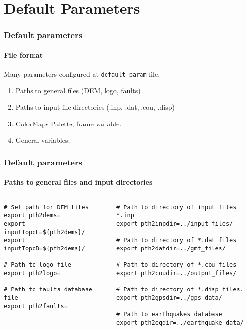 \section[Defaults]{Default Parameters}

\graphicspath{{Chapter3/Figs/Vector/}}

\begin{frame}
  \frametitle{Default parameters}
  \framesubtitle{File format}
  \label{ch3fr:defformat}
  
Many parameters configured at \texttt{default-param} file. 
\begin{enumerate}
\item  Paths to general files (DEM, logo, faults) 
\item Paths to input file directories (.inp, .dat, .cou, .disp) 
\item ColorMaps Palette, frame variable. 
\item General variables.
\end{enumerate}
\end{frame}
\note{} %

\begin{frame}[t,fragile]
  \frametitle{Default parameters}
  \framesubtitle{Paths to general files and input directories}
  \label{ch3fr:pth2gen}
\begin{columns}[t]
  \begin{column}{.45\textwidth}
	\begin{scriptsize}
	  \begin{verbatim}
# Set path for DEM files
export pth2dems=
export inputTopoL=${pth2dems}/
export inputTopoB=${pth2dems}/

# Path to logo file
export pth2logo=

# Path to faults database file
export pth2faults=
\end{verbatim}
    \end{scriptsize}
  \end{column}
  \begin{column}{.54\textwidth}
\begin{scriptsize}
	\begin{verbatim}
# Path to directory of input files *.inp
export pth2inpdir=../input_files/

# Path to directory of *.dat files
export pth2datdir=../gmt_files/

# Path to directory of *.cou files
export pth2coudir=../output_files/

# Path to directory of *.disp files.
export pth2gpsdir=../gps_data/

# Path to earthquakes database
export pth2eqdir=../earthquake_data/
\end{verbatim}	  
	\end{scriptsize}
  \end{column}
\end{columns}
\end{frame}
\note{} %

